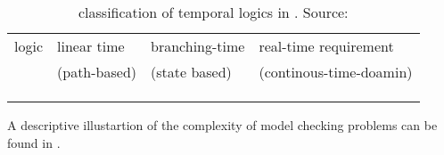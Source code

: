 \begin{table}[h]
		\begin{left}
			\begin{tabular}{l|l|l|l}
	 		logic  &  linear time  &  branching-time  & real-time requirement  \\ 
	 		       &  (path-based) &  (state based)   & (continous-time-doamin) \\  \hline 
		           &   \checkmark  &                  &                         \\  
		     	   &               &  \checkmark      &     \checkmark          \\  
		     	   &               &  \checkmark       &    \checkmark          \\   
	        \end{tabular}
		\end{left}
		\caption{classification of temporal logics in \cite{BK}. Source: \cite{BK} } 
		\label{tab:RealTimeSystemsAndTime}
	\end{table}
	
A descriptive illustartion of the complexity of model checking problems can be found in  \cite[p. 314]{BK}.

